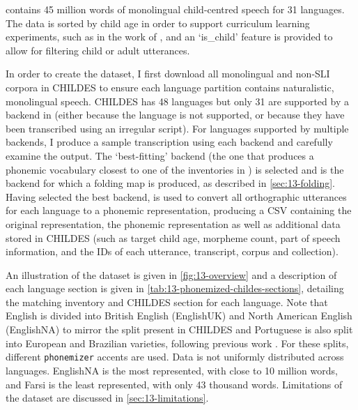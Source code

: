 \ipachildes contains 45 million words of monolingual child-centred speech for 31 languages. The data is sorted by child age in order to support curriculum learning experiments, such as in the work of \citet{huebner-etal-2021-babyberta}, and an `is\_child' feature is provided to allow for filtering child or adult utterances.

In order to create the dataset, I first download all monolingual and non-SLI corpora in CHILDES to ensure each language partition contains naturalistic, monolingual speech. CHILDES has 48 languages but only 31 are supported by a backend in \gpp (either because the language is not supported, or because they have been transcribed using an irregular script). For languages supported by multiple backends, I produce a sample transcription using each backend and carefully examine the output. The `best-fitting' backend (the one that produces a phonemic vocabulary closest to one of the inventories in \phoible) is selected and is the backend for which a folding map is produced, as described in \cref{sec:13-folding}. Having selected the best backend, \gpp is used to convert all orthographic utterances for each language to a phonemic representation, producing a CSV containing the original representation, the phonemic representation as well as additional data stored in CHILDES (such as target child age, morpheme count, part of speech information, and the IDs of each utterance, transcript, corpus and collection). 

An illustration of the dataset is given in \cref{fig:13-overview} and a description of each language section is given in \cref{tab:13-phonemized-childes-sections}, detailing the matching \phoible inventory and CHILDES section for each language. Note that English is divided into British English (EnglishUK) and North American English (EnglishNA) to mirror the split present in CHILDES and Portuguese is also split into European and Brazilian varieties, following previous work \citep{caines2019cross}. For these splits, different \texttt{phonemizer} accents are used. Data is not uniformly distributed across languages. EnglishNA is the most represented, with close to 10 million words, and Farsi is the least represented, with only 43 thousand words. Limitations of the dataset are discussed in \cref{sec:13-limitations}.

